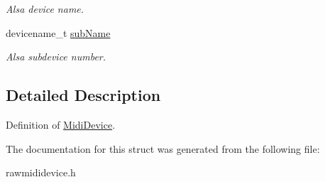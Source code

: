 \begin{DoxyCompactItemize}
\begin{DoxyCompactList}\small\item\em Alsa device name. \end{DoxyCompactList}\item 
\hypertarget{structNl_1_1MidiDevice_a8772de8d4d64d9d62871a09396200a1b}{}devicename\+\_\+t \hyperlink{structNl_1_1MidiDevice_a8772de8d4d64d9d62871a09396200a1b}{sub\+Name}\label{structNl_1_1MidiDevice_a8772de8d4d64d9d62871a09396200a1b}

\begin{DoxyCompactList}\small\item\em Alsa subdevice number. \end{DoxyCompactList}\end{DoxyCompactItemize}


\subsection{Detailed Description}
Definition of \hyperlink{structNl_1_1MidiDevice}{Midi\+Device}. 

The documentation for this struct was generated from the following file\+:\begin{DoxyCompactItemize}
\item 
rawmididevice.\+h\end{DoxyCompactItemize}
